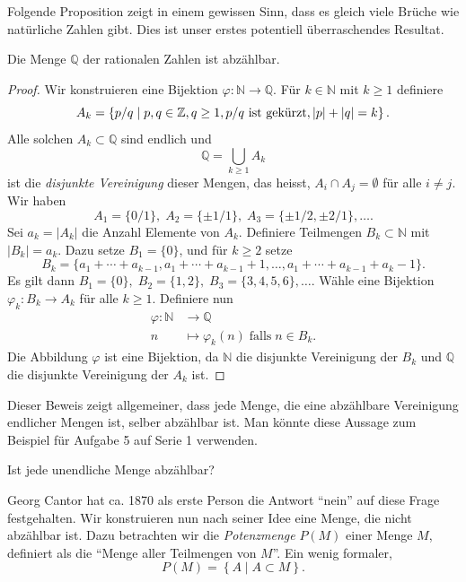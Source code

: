 \documentclass[../main.tex]{subfiles}
\begin{document}
Folgende Proposition zeigt in einem gewissen Sinn, dass es gleich viele Brüche
wie natürliche Zahlen gibt. Dies ist unser erstes potentiell überraschendes
Resultat.

\begin{proposition}\label{prop:q-countable}
  Die Menge $\mathbb Q$ der rationalen Zahlen ist abzählbar.
\end{proposition}


\begin{proof}
  Wir konstruieren eine Bijektion $\varphi \colon \mathbb N \to \mathbb Q$.
  Für $k \in \mathbb N$ mit $k \geq 1$ definiere
  \[
    A_{k} = \left\{p/q \mid p, q \in \mathbb Z, q \geq 1, p/q \textup{ ist gekürzt},
    |p| + |q| = k\right\}.
  \]
  Alle solchen $A_{k} \subset \mathbb Q$ sind endlich und
  \[
    \mathbb Q = \bigcup_{k \geq 1} A_{k}
  \]
  ist die \emph{disjunkte Vereinigung} dieser Mengen,
  das heisst, $A_i \cap A_j = \emptyset$ für alle $i \neq j$.
  Wir haben
  \[
    A_{1} = \{0/1\}, \; A_{2} = \{\pm 1/1\}, \; A_{3} = \{\pm 1/2, \pm 2/1\}, \dots.
  \]
  Sei $a_{k} = |A_{k}|$ die Anzahl Elemente von $A_{k}$.
  Definiere Teilmengen $B_{k} \subset \mathbb N$ mit $|B_{k}| = a_{k}$.
  Dazu setze $B_{1} = \{0\}$, und für $k \geq 2$ setze
  \[
    B_{k} = \{a_{1} + \cdots + a_{k-1},
    a_{1} + \cdots + a_{k-1} + 1, \dots,
    a_{1} + \cdots + a_{k-1} + a_{k} - 1\}.
  \]
  Es gilt dann
  \(
    B_{1} = \{0\}, \; B_{2} = \{1, 2\}, \; B_{3} = \{3, 4, 5, 6\}, \dots.
  \)
Wähle eine Bijektion $\varphi_{k} \colon B_{k} \to A_{k}$ für alle $k \geq 1$.
Definiere nun
\begin{align*}
  \varphi \colon \mathbb N &\to \mathbb Q \\
  n &\mapsto \varphi_{k}(n) \;\text{falls}\; n \in B_{k}.
\end{align*}
Die Abbildung $\varphi$ ist eine Bijektion, da $\mathbb N$ die disjunkte
Vereinigung der $B_{k}$ und $\mathbb Q$ die disjunkte Vereinigung
der $A_{k}$ ist.
\end{proof}

Dieser Beweis zeigt allgemeiner, dass jede Menge, die eine abzählbare Vereinigung
endlicher Mengen ist, selber abzählbar ist. Man könnte diese Aussage
zum Beispiel für Aufgabe 5 auf Serie 1 verwenden.

\begin{question}
  Ist jede unendliche Menge abzählbar?
\end{question}

Georg Cantor hat ca. 1870 als erste Person die Antwort ``nein'' auf diese Frage
festgehalten.
Wir konstruieren nun nach seiner Idee
eine Menge, die nicht abzählbar ist.
Dazu betrachten wir die \emph{Potenzmenge} $P(M)$
einer Menge $M$, definiert als die ``Menge aller Teilmengen von $M$''.
Ein wenig formaler,
\[P(M) = \left\{A \mid A \subset M\right\}.\]
\end{document}

